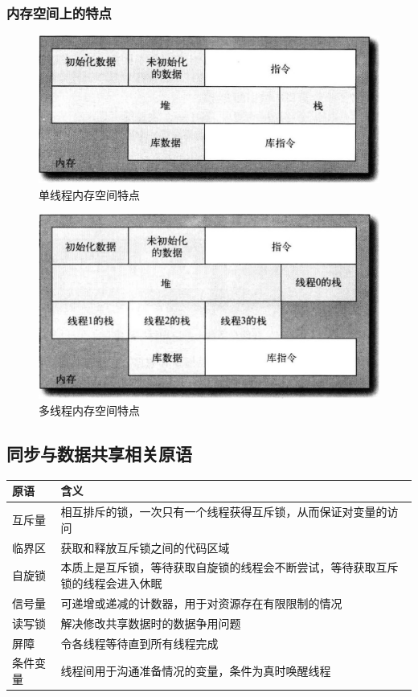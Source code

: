 \documentclass{article}
\begin{document}
\subsubsection{内存空间上的特点}
\begin{figure}[H]
	\centering
	\includegraphics[width = .8\textwidth]{single_mem.jpg}
	\caption{单线程内存空间特点}
\end{figure}
\begin{figure}[H]
	\centering
	\includegraphics[width = .8\textwidth]{muti_mem.jpg}
	\caption{多线程内存空间特点}
\end{figure}

\subsection{同步与数据共享相关原语}
\begin{tabular}[H]{|l|l|}%
	\hline  %
	原语	&	含义\\
	\hline
	互斥量   & 相互排斥的锁，一次只有一个线程获得互斥锁，从而保证对变量的访问                 \\
	\hline
	临界区   & 获取和释放互斥锁之间的代码区域                                                 \\
	\hline
	自旋锁   & 本质上是互斥锁，等待获取自旋锁的线程会不断尝试，等待获取互斥锁的线程会进入休眠 \\
	\hline
	信号量   & 可递增或递减的计数器，用于对资源存在有限限制的情况                             \\
	\hline
	读写锁   & 解决修改共享数据时的数据争用问题                                               \\
	\hline
	屏障     & 令各线程等待直到所有线程完成                                                   \\
	\hline
	条件变量 & 线程间用于沟通准备情况的变量，条件为真时唤醒线程                               \\
	\hline  %
\end{tabular}
\end{document}
